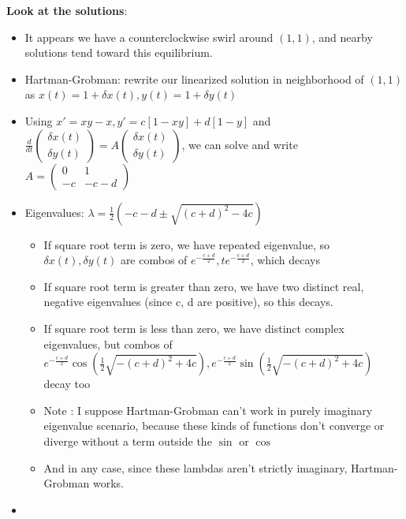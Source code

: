 \documentclass[11pt, oneside]{article}   	%
\begin{document}
\begin{itemize}
\textbf{Look at the solutions}:
\begin{itemize}
\item It appears we have a counterclockwise swirl around $(1,1)$, and nearby solutions tend toward this equilibrium.
\item Hartman-Grobman: rewrite our linearized solution in neighborhood of $(1,1)$ as $x(t) = 1 + \delta x(t), y(t) = 1 + \delta y(t)$
\item Using $x' = xy-x, y'=c[1-xy]+d[1-y]$ and $\frac{d}{dt}\begin{pmatrix} \delta x(t) \\ \delta y(t) \end{pmatrix} = A\begin{pmatrix} \delta x(t) \\ \delta y(t) \end{pmatrix}$, we can solve and write $A = \begin{pmatrix} 0 & 1 \\ -c & -c-d  \end{pmatrix} $
\item Eigenvalues: $\lambda = \frac{1}{2}(-c -d \pm \sqrt{(c+d)^2 - 4c})$
\begin{itemize}
\item If square root term is zero, we have repeated eigenvalue, so $\delta x(t), \delta y(t)$ are combos of $e^{-\frac{c+d}{2}}, te^{-\frac{c+d}{2}}$, which decays
\item If square root term is greater than zero, we have two distinct real, negative eigenvalues (since c, d are positive), so this decays.
\item If square root term is less than zero, we have distinct complex eigenvalues, but combos of $e^{-\frac{c+d}{2}} \cos (\frac{1}{2} \sqrt{-(c+d)^2+4c}), e^{-\frac{c+d}{2}} \sin (\frac{1}{2} \sqrt{-(c+d)^2+4c})$ decay too
\item Note : I suppose Hartman-Grobman can't work in purely imaginary eigenvalue scenario, because these kinds of functions don't converge or diverge without a term outside the $\sin$ or $\cos$ 
\item And in any case, since these lambdas aren't strictly imaginary, Hartman-Grobman works.
\end{itemize}

\end{itemize}

\end{itemize}


\begin{itemize}
\item 
\end{itemize}
\end{document}
